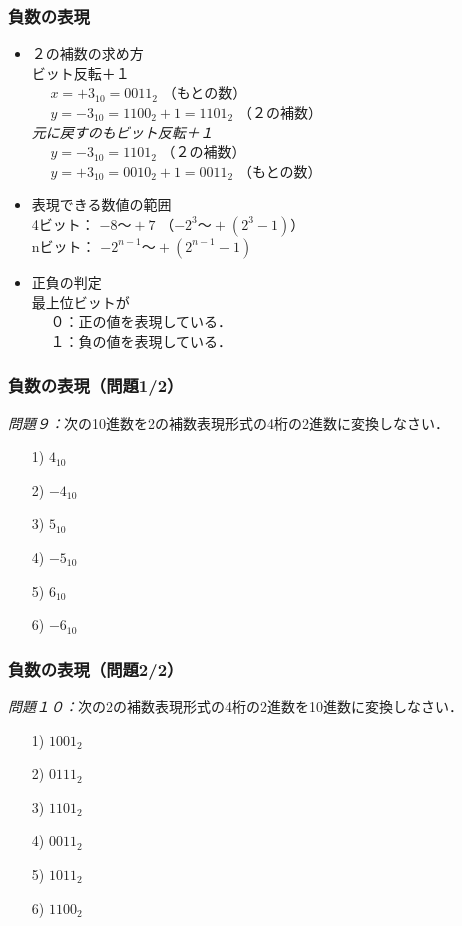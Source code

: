 \documentclass{beamer}                 %
\begin{document}
\begin{frame}
  \frametitle{負数の表現}
  \begin{itemize}
  \item ２の補数の求め方 \\
    ビット反転＋１\\
    ~~ $x = +3_{10} = 0011_2$ （もとの数）\\
    ~~ $y = -3_{10} = 1100_2 + 1 = 1101_2$ （２の補数）\\
    \emph{元に戻すのもビット反転＋１}\\
    ~~ $y = -3_{10} = 1101_2$ （２の補数）\\
    ~~ $y = +3_{10} = 0010_2 + 1 = 0011_2$ （もとの数）\\
    \vfill
  \item 表現できる数値の範囲 \\
    4ビット： $-8 〜 +7$ （$-2^3〜+(2^3-1)$） \\
    nビット： $-2^{n-1} 〜 +(2^{n-1} - 1)$
    \vfill
  \item 正負の判定 \\
    最上位ビットが \\
    ~~ ０：正の値を表現している．\\
    ~~ １：負の値を表現している．
  \end{itemize}
\end{frame}

\begin{frame}
  \frametitle{負数の表現（問題1/2）}
\emph{問題９：}次の10進数を2の補数表現形式の4桁の2進数に変換しなさい．
\begin{enumerate}
\item[1)] $4_{10}$
\vfill
\item[2)] $-4_{10}$
\vfill
\item[3)] $5_{10}$
\vfill
\item[4)] $-5_{10}$
\vfill
\item[5)] $6_{10}$
\vfill
\item[6)] $-6_{10}$
\vfill
\end{enumerate}
\end{frame}

\begin{frame}
  \frametitle{負数の表現（問題2/2）}
\emph{問題１０：}次の2の補数表現形式の4桁の2進数を10進数に変換しなさい．
\begin{enumerate}
\item[1)] $1001_2$
\vfill
\item[2)] $0111_2$
\vfill
\item[3)] $1101_2$
\vfill
\item[4)] $0011_2$
\vfill
\item[5)] $1011_2$
\vfill
\item[6)] $1100_2$
\vfill
\end{enumerate}
\end{frame}
\end{document}
